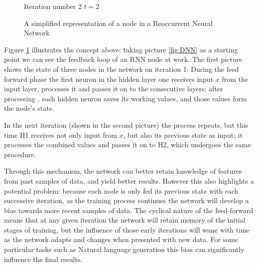 \begin{figure}[H]
\centering    
{}
\begin{center}
Iteration number 2 $t=2$
\end{center}
    \caption{A simplified representation of a node in a Reoccurrent Neural Network}\label{fig:rnn_neuron}
    
\end{figure}
\clearpage
Figure \ref{fig:rnn_neuron} illustrates the concept above: taking picture \ref{fig:DNN} as a starting point we can see the feedback loop of an RNN node at work.
The first picture shows the state of three nodes in the network on iteration 1: During the feed forward phase the first neuron in the hidden layer one receives input $x$ from the input layer, processes it and passes it on to the consecutive layers; after processing , each hidden neuron saves its working values, and those values form the node's state.  

In the next iteration (shown in the second picture) the process repeats, but this time H1 receives not only input from $x$, but also its previous state as input; it processes the combined values and passes it on to H2, which undergoes the same procedure.

Through this mechanism, the network can better retain knowledge of features from past samples of data, and yield better results.
However this also highlights a potential problem: because each node is only fed its previous state with each successive iteration, as the training process continues the network will develop a bias towards more recent samples of data.
 The cyclical nature of the feed-forward means that at any given iteration the network will retain memory of the initial stages of training, but the influence of those early iterations will wane with time as the network adapts and changes when presented with new data.
For some particular tasks such as Natural language generation this bias can significantly influence the final results.

